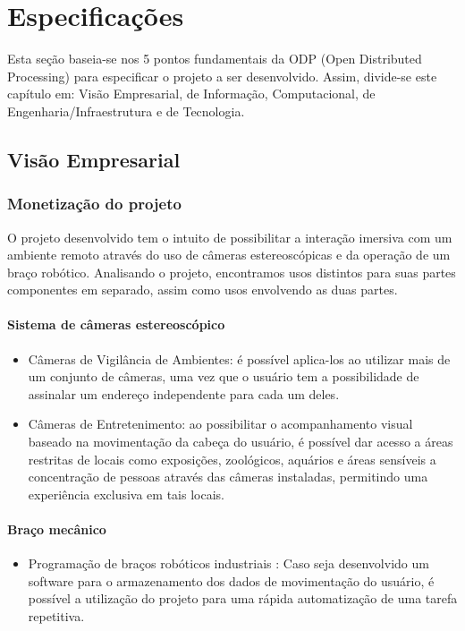 		\chapter{Especificações}\label{cap-especificacao}
		
		
	Esta seção baseia-se nos 5 pontos fundamentais da ODP (Open Distributed Processing)	para especificar o projeto a ser desenvolvido. Assim, divide-se este capítulo em:	Visão Empresarial, de Informação, Computacional, de Engenharia/Infraestrutura e de Tecnologia.\par
		\section{Visão Empresarial}\label{sec-empresarial}
	\subsection{Monetização do projeto}\label{subsec-monetizacao}
		O projeto desenvolvido tem o intuito de possibilitar a interação imersiva com um ambiente remoto através do uso de câmeras estereoscópicas e da operação de um braço robótico. Analisando o projeto, encontramos usos distintos para suas partes componentes em separado, assim como usos envolvendo as duas partes.
		
		\subsubsection{Sistema de câmeras estereoscópico}	\label{subsubsec-cameras}
			\begin{itemize}
	\item Câmeras de Vigilância de Ambientes: é possível aplica-los ao utilizar mais de um conjunto de câmeras, uma vez que o usuário tem a possibilidade de assinalar um endereço independente para cada um deles.
	
	\item Câmeras de Entretenimento: ao possibilitar o acompanhamento visual baseado na movimentação da cabeça do usuário, é possível dar acesso a áreas restritas de locais como exposições, zoológicos, aquários e áreas sensíveis a concentração de pessoas através das câmeras instaladas, permitindo uma experiência exclusiva em tais locais. 
	\end{itemize}
		\subsubsection{Braço mecânico}\label{subsubsec-braco}
	\begin{itemize}
	\item Programação de braços robóticos industriais : Caso seja desenvolvido um software para o armazenamento dos dados de movimentação do usuário, é possível a utilização do projeto para uma rápida automatização de uma tarefa repetitiva.
	\end{itemize}	
